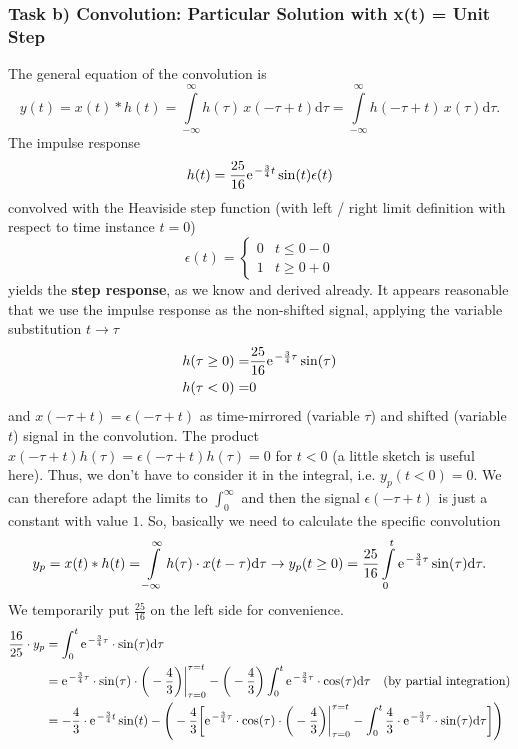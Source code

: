 \documentclass[11pt,a4paper,DIV=12]{scrartcl}
\begin{document}
\subsubsection{Task b) Convolution: Particular Solution with x(t) = Unit Step}
The general equation of the convolution is
\begin{equation}
	y(t) = x(t) \ast h(t) =
	\int\limits_{-\infty}^{\infty}h(\tau) \, x(-\tau+t)\mathrm{d}\tau=
	\int\limits_{-\infty}^{\infty}h(-\tau+t)\, x(\tau)\mathrm{d}\tau.
\end{equation}
The impulse response
\begin{align}
h(t)=\frac{25}{16}\e^{-\frac{3}{4}t}\sin(t) \epsilon(t)
\end{align}
convolved with the Heaviside step function (with left / right limit definition
with respect to
time instance $t=0$)
\begin{equation}
\epsilon(t) =
\begin{cases}
  0 & t\leq 0-0\\
  1 & t\geq 0+0
\end{cases}
\end{equation}
yields the \textbf{step response}, as we know and derived already.
%
It appears reasonable that we use the impulse response as the non-shifted signal, applying the variable substitution $t \to \tau$
\begin{align}
h(\tau\geq 0) =& \frac{25}{16} \e^{-\frac{3}{4} \tau} \sin(\tau)\\
h(\tau < 0) =& 0
\end{align}
and $x(-\tau + t) = \epsilon(-\tau + t)$ as time-mirrored (variable $\tau$) and shifted (variable $t$)
signal in the convolution.
%
The product $x(-\tau + t) h(\tau) = \epsilon(-\tau + t) h(\tau) = 0$ for $t<0$ (a little
sketch is useful here). Thus, we don't have to consider it in the integral, i.e. $y_p(t<0)=0$.
%
We can therefore adapt the limits to $\int_0^\infty$ and then the signal $\epsilon(-\tau + t)$
is just a constant with value $1$.
%
So, basically we need to calculate the specific convolution
%
\begin{align}
	y_p = x(t) \ast h(t) =
	\int\limits_{-\infty}^{\infty}h(\tau)\cdot x(t-\tau)\mathrm{d}\tau\rightarrow
	y_p(t \geq 0) = \frac{25}{16}\int\limits_{0}^{t} \e^{-\frac{3}{4}\tau}\sin(\tau)\mathrm{d}\tau.
\end{align}
%
We temporarily put $\frac{25}{16}$ on the left side for convenience.
%
\begin{align}
	\frac{16}{25}\cdot y_p &= \int_0^t\e^{-\frac{3}{4}\tau}\cdot \sin(\tau)\mathrm{d}\tau\nonumber \\
	&= \e^{-\frac{3}{4}\tau}\cdot \sin(\tau)\cdot \bigg (-\frac{4}{3} \bigg )\bigg|_{\tau=0}^{\tau=t}-\bigg (-\frac{4}{3}\bigg )\int_0^t\e^{-\frac{3}{4}\tau}\cdot \cos(\tau)\mathrm{d}\tau \quad\text{(by partial integration)} \nonumber \\
	&= -\frac{4}{3}\cdot \e^{-\frac{3}{4}t}\sin(t)-\Bigg (-\frac{4}{3} \bigg [\e^{-\frac{3}{4}\tau}\cdot \cos(\tau)\cdot \bigg (-\frac{4}{3}\bigg )\bigg |_{\tau=0}^{\tau=t}-\int_0^t \frac{4}{3} \cdot \e^{-\frac{3}{4}\tau}\cdot \sin(\tau)\mathrm{d}\tau\bigg ] \Bigg ) \nonumber
\end{align}
\end{document}
